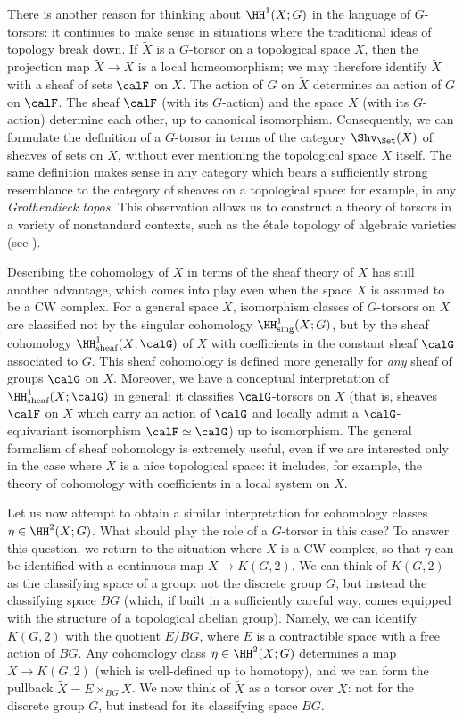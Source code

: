 There is another reason for thinking about $\HH^{1}(X;G)$ in the language of $G$-torsors: it continues to make sense in situations where the traditional ideas of topology break down. If $\widetilde{X}$ is a $G$-torsor on a topological space $X$, then the projection map
$\widetilde{X} \rightarrow X$ is a local homeomorphism; we may therefore identify $\widetilde{X}$
with a sheaf of sets $\calF$ on $X$. The action of $G$ on $\widetilde{X}$ determines an action of
$G$ on $\calF$. The sheaf $\calF$ (with its $G$-action) and the space $\widetilde{X}$ (with its $G$-action) determine each other, up to canonical isomorphism. Consequently, we can formulate
the definition of a $G$-torsor in terms of the category $\Shv_{\Set}(X)$ of sheaves of sets
on $X$, without ever mentioning the topological space $X$ itself. The same definition makes
sense in any category which bears a sufficiently strong resemblance to the category of sheaves on a topological space: for example, in any {\em Grothendieck topos}. This observation allows us to construct a theory of torsors in a variety of nonstandard contexts, such as the \'{e}tale topology of algebraic varieties (see \cite{SGA}).

Describing the cohomology of $X$ in terms of the sheaf theory of $X$ has still another advantage, which comes into play even when the space $X$ is assumed to be a CW complex. For a general space
$X$, isomorphism classes of $G$-torsors on $X$ are classified not by the singular cohomology
$\HH^1_{\text{sing}}(X;G)$, but by the sheaf cohomology $\HH^{1}_{\text{sheaf}}(X; \calG)$ of
$X$ with coefficients in the constant sheaf $\calG$ associated to $G$. This sheaf cohomology is defined more generally for {\em any} sheaf of groups $\calG$ on $X$.
Moreover, we have a conceptual interpretation of $\HH^{1}_{\text{sheaf}}(X; \calG)$ in general: it classifies
$\calG$-torsors on $X$ (that is, sheaves $\calF$ on $X$ which carry an action of $\calG$ and locally admit a $\calG$-equivariant isomorphism $\calF \simeq \calG$) up to isomorphism. The general formalism of sheaf cohomology is extremely useful, even if we are interested only in the case where $X$ is a nice topological space: it includes, for example, the theory of cohomology with coefficients in a local system on $X$.

Let us now attempt to obtain a similar interpretation for cohomology classes $\eta \in \HH^{2}(X;G)$. 
What should play the role of a $G$-torsor in this case?
To answer this question, we return to the situation where $X$ is a CW complex, so that
$\eta$ can be identified with a continuous map $X \rightarrow K(G,2)$. 
We can think of
$K(G,2)$ as the classifying space of a group: not the discrete group $G$, but instead the classifying space $BG$ (which, if built in a sufficiently careful way, comes equipped with the structure of a topological abelian group). Namely, we can identify $K(G,2)$ with the quotient
$E/BG$, where $E$ is a contractible space with a free action of $BG$.
Any cohomology class $\eta \in \HH^{2}(X;G)$ determines a map $X \rightarrow K(G,2)$
(which is well-defined up to homotopy), and we can form the pullback $\widetilde{X} = E \times_{BG} X$. We now think of $\widetilde{X}$ as a torsor over $X$: not for the discrete group $G$, but instead for its classifying space $BG$.

